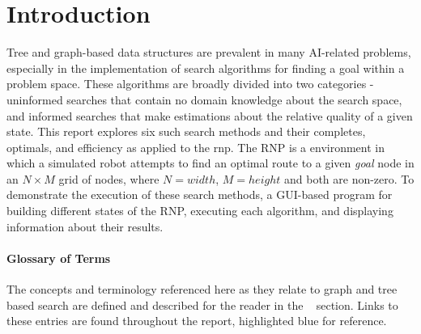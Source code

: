 \section{Introduction} %
\label{sec:introduction}
Tree and graph-based data structures are prevalent in many AI-related problems, especially in the implementation of search algorithms for finding a goal within a problem space. These algorithms are broadly divided into two categories - \Gls{uninformed} searches that contain no domain knowledge about the search space, and \Gls{informed} searches that make estimations about the relative quality of a given state. This report explores six such search methods and their \glspl{complete}, \glspl{optimal}, and efficiency as applied to the \acrlong{rnp}. The RNP is a \Gls{environment} in which a simulated robot attempts to find an optimal route to a given \textit{goal} \gls{node} in an $N \times M$ grid of nodes, where $N=width$, $M=height$ and both are non-zero. To demonstrate the execution of these search methods, a GUI-based program for building different states of the RNP, executing each algorithm, and displaying information about their results.

\paragraph{Glossary of Terms} %
\label{par:glossary_of_terms}
The concepts and terminology referenced here as they relate to graph and tree based search are defined and described for the reader in the ~\pageref{glossaries} section. Links to these entries are found throughout the report, highlighted blue for reference.
